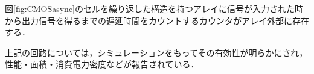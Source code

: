 \begin{itemize}
図\ref{fig:CMOSasync}のセルを繰り返した構造を持つアレイに信号が入力された時から出力信号を得るまでの遅延時間をカウントするカウンタがアレイ外部に存在する．
\end{itemize}
上記の回路については，シミュレーションをもってその有効性が明らかにされ，
性能・面積・消費電力密度などが報告されている．

